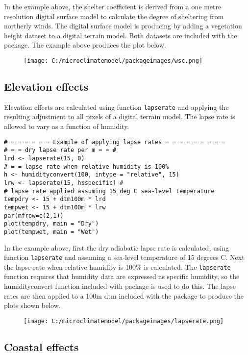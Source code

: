 \documentclass[]{article}
\begin{document}
In the example above, the shelter coefficient is derived from a one
metre resolution digital surface model to calculate the degree of
sheltering from northerly winds. The digital surface model is producing
by adding a vegetation height dataset to a digital terrain model. Both
datasets are included with the package. The example above produces the
plot below.

\begin{figure}
\centering
\texttt{[image: C:/microclimatemodel/packageimages/wsc.png]}
\caption{}
\end{figure}

\subsection{Elevation effects}\label{elevation-effects}

Elevation effects are calculated using function \texttt{lapserate} and
applying the resulting adjustment to all pixels of a digital terrain
model. The lapse rate is allowed to vary as a function of humidity.

\begin{verbatim}
# = = = = = = Example of applying lapse rates = = = = = = = = =
# = = dry lapse rate per m = = #
lrd <- lapserate(15, 0)
# = = lapse rate when relative humidity is 100%
h <- humidityconvert(100, intype = "relative", 15) 
lrw <- lapserate(15, h$specific) #
# lapse rate applied assuming 15 deg C sea-level temperature
tempdry <- 15 + dtm100m * lrd 
tempwet <- 15 + dtm100m * lrw 
par(mfrow=c(2,1))
plot(tempdry, main = "Dry")
plot(tempwet, main = "Wet")
\end{verbatim}

In the example above, first the dry adiabatic lapse rate is calculated,
using function \texttt{lapserate} and assuming a sea-level temperature
of 15 degrees C. Next the lapse rate when relative humidity is 100\% is
calculated. The \texttt{lapserate} function requires that humidity data
are expressed as specific humidity, so the humidityconvert function
included with package is used to do this. The lapse rates are then
applied to a 100m dtm included with the package to produce the plots
shown below.

\begin{figure}
\centering
\texttt{[image: C:/microclimatemodel/packageimages/lapserate.png]}
\caption{}
\end{figure}

\subsection{Coastal effects}\label{coastal-effects}
\end{document}
